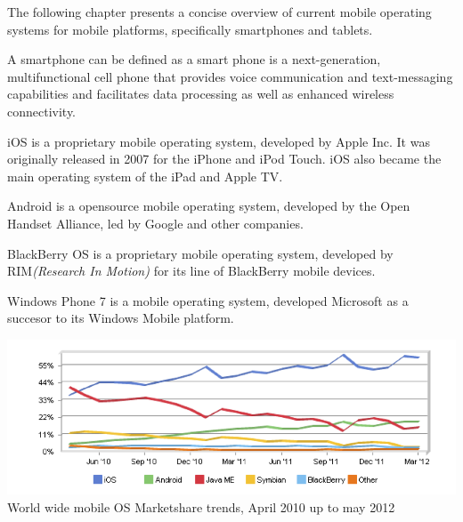
The following chapter presents a concise overview of current mobile operating systems for mobile platforms, specifically smartphones and tablets.

A smartphone can be defined as a smart phone is a next-generation, multifunctional cell phone that provides voice communication and text-messaging capabilities and facilitates data processing as well as enhanced wireless connectivity.\cite{Ni2006}

iOS is a proprietary mobile operating system, developed by Apple Inc. It was originally released in 2007 for the iPhone and iPod Touch. iOS also became the main operating system of the iPad and Apple TV.

Android is a opensource mobile operating system, developed by the Open Handset Alliance, led by Google and other companies.\cite{Inc.2012}

BlackBerry OS is a proprietary mobile operating system, developed by RIM\emph{(Research In Motion)} for its line of BlackBerry mobile devices.

Windows Phone 7 is a mobile operating system, developed Microsoft as a succesor to its Windows Mobile platform.





\begin{centering}
\includegraphics[scale=0.5]{images/marketsharetrendsApril10Tomay12.png}\\{World wide mobile OS Marketshare trends, April 2010 up to may 2012}\\
\end{centering}


